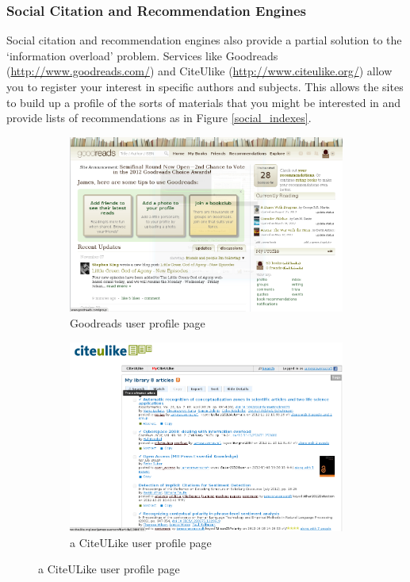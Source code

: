 \documentclass[12pt,a4paper]{article}
\begin{document}
\subsubsection{Social Citation and Recommendation Engines}
Social citation and recommendation engines also provide a partial solution to
the `information overload' problem.  Services like Goodreads
(\url{http://www.goodreads.com/}) and CiteUlike
(\url{http://www.citeulike.org/}) allow you to register your interest in
specific authors and subjects. This allows the sites to build up a profile of
the sorts of materials that you might be interested in and provide lists of
recommendations as in Figure \ref{social_indexes}.

\begin{figure}[!hbt]
        \centering
        \begin{subfigure}[b]{0.50\textwidth}
                \centering
                \includegraphics[width=\textwidth]{images/goodreads_index.png}
                \caption{Goodreads user profile page}
                \label{fig:goodreads_index}
        \end{subfigure}%
        \begin{subfigure}[b]{0.50\textwidth}
                \centering
                \includegraphics[width=\textwidth]{images/citeulike_index.png}
                \caption{a CiteULike user profile page}
                \label{fig:citeulike_index}
        \end{subfigure}


\end{figure}
\end{document}
